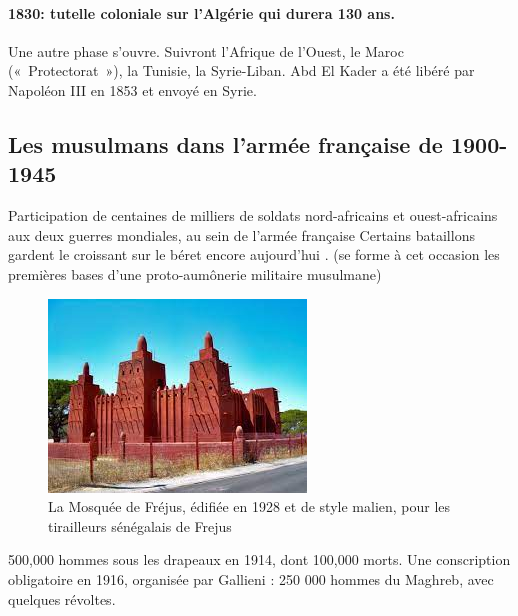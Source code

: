 \paragraph{1830: tutelle coloniale sur l’Algérie qui durera 130 ans.}
Une autre phase s'ouvre. 
Suivront l’Afrique de l’Ouest, le Maroc (« Protectorat »), la Tunisie, la Syrie-Liban. Abd El Kader a été libéré par Napoléon III en 1853 et envoyé en Syrie.




\subsection{Les musulmans dans l'armée française de 1900-1945}
{Participation de centaines de milliers de soldats nord-africains et ouest-africains aux deux guerres mondiales, au sein de l’armée française}
Certains bataillons gardent le croissant sur le béret encore aujourd'hui .
(se forme à cet occasion les premières bases d’une proto-aumônerie militaire musulmane) 
\begin{figure}
    \centering
    \includegraphics[width=\textwidth]{Images/MosqueeFrejus.jpg}
    \caption{La Mosquée de Fréjus, édifiée en 1928 et de style malien, pour les tirailleurs sénégalais de Frejus}
    \label{fig:Frejus}
\end{figure}





500,000 hommes sous les drapeaux en 1914, dont 100,000 morts. Une conscription obligatoire en 1916, organisée par Gallieni : 250 000 hommes du Maghreb, avec quelques révoltes.
 
